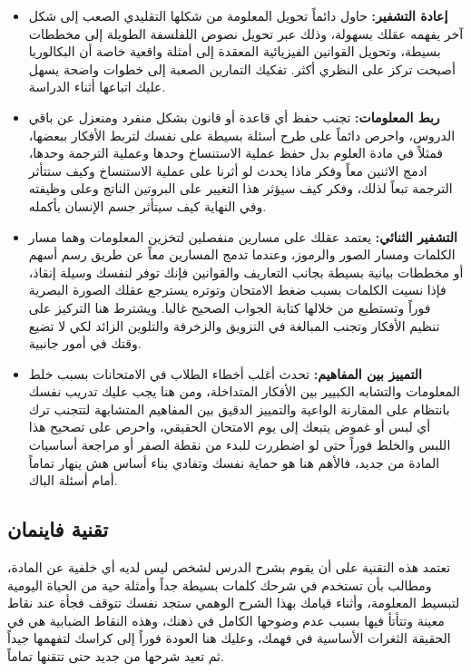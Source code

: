 \documentclass[12pt,a4paper]{book}
\begin{document}
\begin{itemize}
	\item \textbf{إعادة التشفير:} حاول دائماً تحويل المعلومة من شكلها التقليدي الصعب إلى شكل آخر يفهمه عقلك بسهولة، وذلك عبر تحويل نصوص اللفلسفة الطويلة إلى مخططات بسيطة، وتحويل القوانين الفيزيائية المعقدة إلى أمثلة واقعية خاصة أن البكالوريا أصبحت تركز على النظري أكثر. تفكيك التمارين الصعبة إلى خطوات واضحة يسهل عليك اتباعها أثناء الدراسة.
	
	\item \textbf{ربط المعلومات:} تجنب حفظ أي قاعدة أو قانون بشكل منفرد ومنعزل عن باقي الدروس، واحرص دائماً على طرح أسئلة بسيطة على نفسك لتربط الأفكار ببعضها، فمثلاً في مادة العلوم بدل حفظ عملية الاستنساخ وحدها وعملية الترجمة وحدها، ادمج الاثنين معاً وفكر ماذا يحدث لو أثرنا على عملية الاستنساخ وكيف ستتأثر الترجمة تبعاً لذلك، وفكر كيف سيؤثر هذا التغيير على البروتين الناتج وعلى وظيفته وفي النهاية كيف سيتأثر جسم الإنسان بأكمله.
	
	\item \textbf{التشفير الثنائي:} يعتمد عقلك على مسارين منفصلين لتخزين المعلومات وهما مسار الكلمات ومسار الصور والرموز، وعندما تدمج المسارين معاً عن طريق رسم أسهم أو مخططات بيانية بسيطة بجانب التعاريف والقوانين فإنك توفر لنفسك وسيلة إنقاذ، فإذا نسيت الكلمات بسبب ضغط الامتحان وتوتره يسترجع عقلك الصورة البصرية فوراً وتستطيع من خلالها كتابة الجواب الصحيح غالبا. ويشترط هنا التركيز على تنظيم الأفكار وتجنب المبالغة في التزويق والزخرفة والتلوين الزائد لكي لا تضيع وقتك في أمور جانبية.
	
	\item \textbf{التمييز بين المفاهيم:} تحدث أغلب أخطاء الطلاب في الامتحانات بسبب خلط المعلومات والتشابه الكبيير بين الأفكار المتداخلة، ومن هنا يجب عليك تدريب نفسك بانتظام على المقارنة الواعية والتمييز الدقيق بين المفاهيم المتشابهة لتتجنب ترك أي لبس أو غموض يتبعك إلى يوم الامتحان الحقيقي، واحرص على تصحيح هذا اللبس والخلط فوراً حتى لو اضطررت للبدء من نقطة الصفر أو مراجعة أساسيات المادة من جديد، فالأهم هنا هو حماية نفسك وتفادي بناء أساس هش ينهار تماماً أمام أسئلة الباك.
\end{itemize}
	
	\subsection{تقنية فاينمان}
	
	تعتمد هذه التقنية على أن يقوم بشرح الدرس لشخص ليس لديه أي خلفية عن المادة، ومطالب بأن تستخدم في شرحك كلمات بسيطة جداً وأمثلة حية من الحياة اليومية لتبسيط المعلومة، وأثناء قيامك بهذا الشرح الوهمي ستجد نفسك تتوقف فجأة عند نقاط معينة وتتأتأ فيها بسبب عدم وضوحها الكامل في ذهنك، وهذه النقاط الضبابية هي في الحقيقة الثغرات الأساسية في فهمك، وعليك هنا العودة فوراً إلى كراسك لتفهمها جيداً ثم تعيد شرحها من جديد حتى تتقنها تماماً.
	
\end{document}
